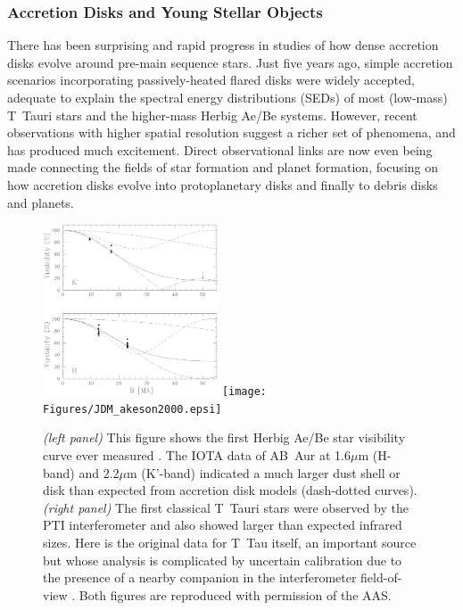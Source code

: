 \documentclass[12pt]{iopart}
\begin{document}
\subsubsection{Accretion Disks and Young Stellar Objects}


There has been surprising and rapid progress in studies of how dense
accretion disks evolve around pre-main sequence stars.  Just five
years ago, simple accretion scenarios incorporating passively-heated
flared disks \citep[e.g.,][]{hillenbrand1992,hartmann1993,chiang1997}
were widely accepted, 
adequate to explain the spectral energy distributions (SEDs) of
most (low-mass) T~Tauri stars and the higher-mass Herbig Ae/Be
systems.  However, recent observations with higher spatial resolution
suggest a richer set of phenomena, and has produced much excitement.
Direct observational links are now even being made connecting the
fields of star formation and planet formation, focusing on how
accretion disks evolve into protoplanetary disks and finally to debris
disks and planets.

\begin{figure}[tbhp]
\begin{center}
\includegraphics[clip,angle=0,height=2.0in]{Figures/JDM_millan.fig1.eps}
\texttt{[image: Figures/JDM\_akeson2000.epsi]}
\caption{\footnotesize {\em (left panel)} This figure shows the
  first Herbig Ae/Be star visibility curve ever measured \citep[see
  Figure~1 by][]{rmg1999a}. The IOTA data of AB~Aur at 1.6$\mu$m (H-band) and
  2.2$\mu$m (K'-band) indicated a much larger dust shell or disk than
  expected from accretion disk models (dash-dotted curves).  {\em
    (right panel)} The first classical T~Tauri stars were observed by
  the PTI interferometer and also showed larger than expected infrared
  sizes.  Here is the original data for T~Tau itself, an important
  source but whose analysis is complicated by uncertain calibration
  due to the presence of a nearby companion in the interferometer
  field-of-view \citep[see Figure~1a by][]{akeson2000}.  Both figures are
  reproduced with permission of the AAS.
\label{ysos}}
\end{center}
\end{figure}
\end{document}
